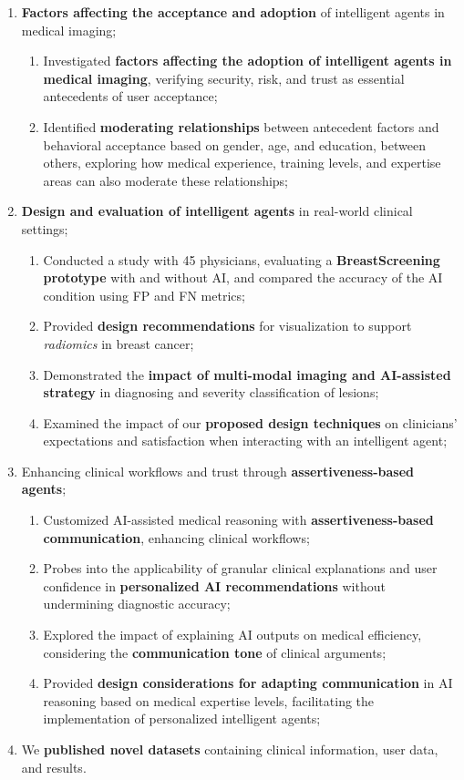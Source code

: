 \begin{enumerate}
\item {\bf Factors affecting the acceptance and adoption} of intelligent agents in medical imaging;
\begin{enumerate}[label*=\arabic*.]
\item Investigated {\bf factors affecting the adoption of intelligent agents in medical imaging}, verifying security, risk, and trust as essential antecedents of user acceptance;
\item Identified {\bf moderating relationships} between antecedent factors and behavioral acceptance based on gender, age, and education, between others, exploring how medical experience, training levels, and expertise areas can also moderate these relationships;
\end{enumerate}
\item {\bf Design and evaluation of intelligent agents} in real-world clinical settings;
\begin{enumerate}[label*=\arabic*.]
\item Conducted a study with 45 physicians, evaluating a {\bf BreastScreening prototype} with and without \ac{AI}, and compared the accuracy of the \ac{AI} condition using \ac{FP} and \ac{FN} metrics;
\item Provided {\bf design recommendations} for visualization to support {\it radiomics} in breast cancer;
\item Demonstrated the {\bf impact of multi-modal imaging and \ac{AI}-assisted strategy} in diagnosing and severity classification of lesions;
\item Examined the impact of our {\bf proposed design techniques} on clinicians' expectations and satisfaction when interacting with an intelligent agent;
\end{enumerate}
\item Enhancing clinical workflows and trust through {\bf assertiveness-based agents};
\begin{enumerate}[label*=\arabic*.]
\item Customized \ac{AI}-assisted medical reasoning with {\bf assertiveness-based communication}, enhancing clinical workflows;
\item Probes into the applicability of granular clinical explanations and user confidence in {\bf personalized \ac{AI} recommendations} without undermining diagnostic accuracy;
\item Explored the impact of explaining \ac{AI} outputs on medical efficiency, considering the {\bf communication tone} of clinical arguments;
\item Provided {\bf design considerations for adapting communication} in \ac{AI} reasoning based on medical expertise levels, facilitating the implementation of personalized intelligent agents;
\end{enumerate}
\item We {\bf published novel datasets} containing clinical information, user data, and results.
\end{enumerate}

